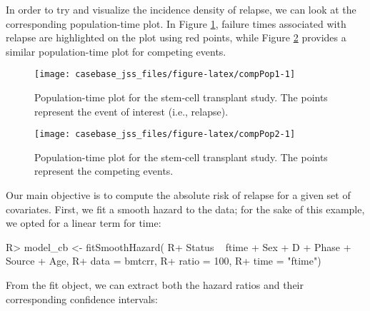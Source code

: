\documentclass[article]{jss}
\begin{document}
In order to try and visualize the incidence density of relapse, we can
look at the corresponding population-time plot. In Figure
\ref{fig:compPop1}, failure times associated with relapse are
highlighted on the plot using red points, while Figure
\ref{fig:compPop2} provides a similar population-time plot for competing
events.

\begin{CodeChunk}
\begin{figure}

{\centering \texttt{[image: casebase\_jss\_files/figure-latex/compPop1-1]} 

}

\caption{\label{fig:compPop1}Population-time plot for the stem-cell transplant study. The points represent the event of interest (i.e., relapse).}\label{fig:compPop1}
\end{figure}
\end{CodeChunk}

\begin{CodeChunk}
\begin{figure}

{\centering \texttt{[image: casebase\_jss\_files/figure-latex/compPop2-1]} 

}

\caption{\label{fig:compPop2}Population-time plot for the stem-cell transplant study. The points represent the competing events.}\label{fig:compPop2}
\end{figure}
\end{CodeChunk}

Our main objective is to compute the absolute risk of relapse for a
given set of covariates. First, we fit a smooth hazard to the data; for
the sake of this example, we opted for a linear term for time:

\begin{CodeChunk}

\begin{CodeInput}
R> model_cb <- fitSmoothHazard(
R+     Status ~ ftime + Sex + D + Phase + Source + Age, 
R+     data = bmtcrr, 
R+     ratio = 100, 
R+     time = "ftime")
\end{CodeInput}
\end{CodeChunk}

From the fit object, we can extract both the hazard ratios and their
corresponding confidence intervals:
\end{document}
